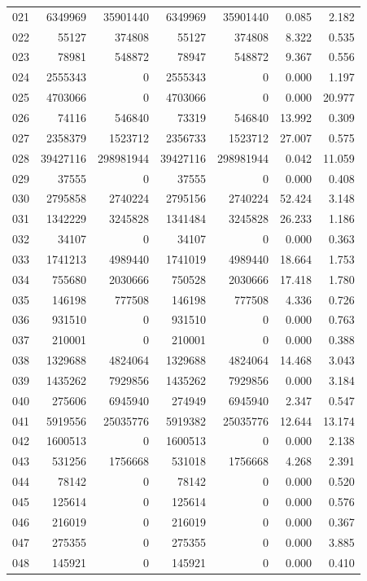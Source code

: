 \begin{longtable}{lrrrrrr}
021 & 6349969 & 35901440 & 6349969 & 35901440 & 0.085 & 2.182\\
022 & 55127 & 374808 & 55127 & 374808 & 8.322 & 0.535\\
023 & 78981 & 548872 & 78947 & 548872 & 9.367 & 0.556\\
024 & 2555343 & 0 & 2555343 & 0 & 0.000 & 1.197\\
025 & 4703066 & 0 & 4703066 & 0 & 0.000 & 20.977\\
026 & 74116 & 546840 & 73319 & 546840 & 13.992 & 0.309\\
027 & 2358379 & 1523712 & 2356733 & 1523712 & 27.007 & 0.575\\
028 & 39427116 & 298981944 & 39427116 & 298981944 & 0.042 & 11.059\\
029 & 37555 & 0 & 37555 & 0 & 0.000 & 0.408\\
030 & 2795858 & 2740224 & 2795156 & 2740224 & 52.424 & 3.148\\
031 & 1342229 & 3245828 & 1341484 & 3245828 & 26.233 & 1.186\\
032 & 34107 & 0 & 34107 & 0 & 0.000 & 0.363\\
033 & 1741213 & 4989440 & 1741019 & 4989440 & 18.664 & 1.753\\
034 & 755680 & 2030666 & 750528 & 2030666 & 17.418 & 1.780\\
035 & 146198 & 777508 & 146198 & 777508 & 4.336 & 0.726\\
036 & 931510 & 0 & 931510 & 0 & 0.000 & 0.763\\
037 & 210001 & 0 & 210001 & 0 & 0.000 & 0.388\\
038 & 1329688 & 4824064 & 1329688 & 4824064 & 14.468 & 3.043\\
039 & 1435262 & 7929856 & 1435262 & 7929856 & 0.000 & 3.184\\
040 & 275606 & 6945940 & 274949 & 6945940 & 2.347 & 0.547\\
041 & 5919556 & 25035776 & 5919382 & 25035776 & 12.644 & 13.174\\
042 & 1600513 & 0 & 1600513 & 0 & 0.000 & 2.138\\
043 & 531256 & 1756668 & 531018 & 1756668 & 4.268 & 2.391\\
044 & 78142 & 0 & 78142 & 0 & 0.000 & 0.520\\
045 & 125614 & 0 & 125614 & 0 & 0.000 & 0.576\\
046 & 216019 & 0 & 216019 & 0 & 0.000 & 0.367\\
047 & 275355 & 0 & 275355 & 0 & 0.000 & 3.885\\
048 & 145921 & 0 & 145921 & 0 & 0.000 & 0.410\\

\end{longtable}
